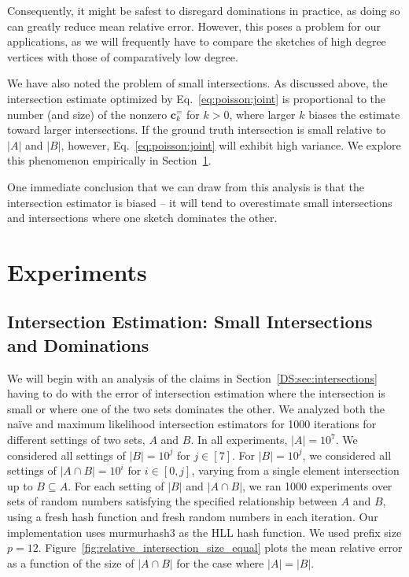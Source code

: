 \documentclass[10]{report}
\newcommand{\algoname}[1]{\textnormal{\textsc{#1}}}
\begin{document}
Consequently, it might be safest to disregard dominations in practice, as doing so can greatly reduce mean relative error.
However, this poses a problem for our applications, as we will frequently have to compare the sketches of high degree vertices with those of comparatively low degree. 

We have also noted the problem of small intersections. 
As discussed above, the intersection estimate optimized by Eq.~\eqref{eq:poisson:joint} is proportional to the number (and size) of the nonzero $\mathbf{c}^{=}_k$ for $k>0$, where larger $k$ biases the estimate toward larger intersections. 
If the ground truth intersection is small relative to $|A|$ and $|B|$, however, Eq.~\eqref{eq:poisson:joint} will exhibit high variance.
We explore this phenomenon empirically in Section~\ref{DS:sec:experiments}.

One immediate conclusion that we can draw from this analysis is that the intersection estimator is biased -- it will tend to overestimate small intersections and intersections where one sketch dominates the other.


\section{Experiments}
 \label{DS:sec:experiments}

\subsection{Intersection Estimation: Small Intersections and Dominations}
 \label{DS:sec:experiments:intersection}

\noindent
We will begin with an analysis of the claims in Section~\ref{DS:sec:intersections} having to do with the error of intersection estimation where the intersection is small or where one of the two sets dominates the other.
We analyzed both the na\"ive and maximum likelihood intersection estimators for 1000 iterations for different settings of two sets, $A$ and $B$. 
In all experiments, $|A| = 10^7$.
We considered all settings of $|B| = 10^j$ for $j \in [7]$.
For $|B| = 10^j$, we considered all settings of $|A \cap B| = {10^i}$ for $i \in [0, j]$, varying from a single element intersection up to $B \subseteq A$. 
For each setting of $|B|$ and $|A \cap B|$, we ran 1000 experiments over sets of random numbers satisfying the specified relationship between $A$ and $B$, using a fresh hash function and fresh random numbers in each iteration.
Our implementation uses murmurhash3 \cite{murmurhash3} as the \algoname{HLL} hash function.
We used prefix size $p=12$.
Figure~\ref{fig:relative_intersection_size_equal} plots the mean relative error as a function of the size of $|A \cap B|$ for the case where $|A| = |B|$. 
\end{document}
